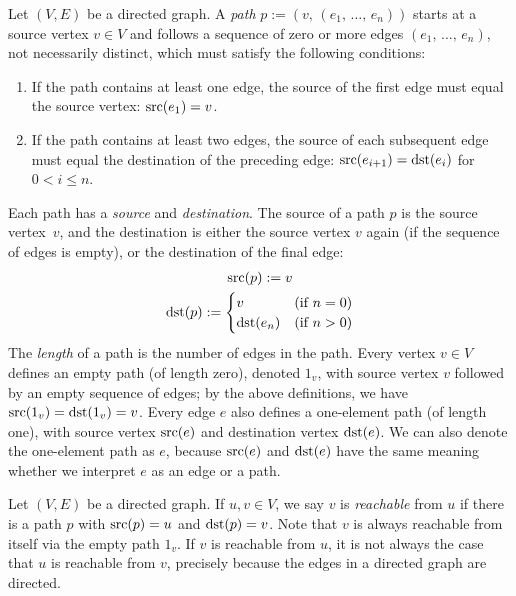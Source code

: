 \documentclass[../generics]{subfiles}
\begin{document}
\begin{definition}\label{digraph path}
Let $(V,E)$ be a directed graph. A \emph{path} $p := (v,\,(e_1,\,\ldots,\,e_n))$ starts at a source vertex $v\in V$ and follows a sequence of zero or more edges $(e_1,\,\ldots,\,e_n)$, not necessarily distinct, which must satisfy the following conditions:
\begin{enumerate}
\item If the path contains at least one edge, the source of the first edge must equal the source vertex: $\operatorname{src}(e_1)=v$.
\item If the path contains at least two edges, the source of each subsequent edge must equal the destination of the preceding edge: $\operatorname{src}(e_{i+1})=\operatorname{dst}(e_i)$ for $0<i\leq n$.
\end{enumerate}
Each path has a \emph{source} and \emph{destination}. The source of a path $p$ is the source vertex~$v$, and the destination is either the source vertex $v$ again (if the sequence of edges is empty), or the destination of the final edge:
\begin{gather*}
\operatorname{src}(p) := v\\
\operatorname{dst}(p) := \begin{cases}
v&\text{(if $n=0$)}\\
\operatorname{dst}(e_n)&\text{(if $n>0$)}
\end{cases}
\end{gather*}
The \emph{length} of a path is the number of edges in the path. Every vertex $v\in V$ defines an empty path (of length zero), denoted $1_v$, with source vertex $v$ followed by an empty sequence of edges; by the above definitions, we have $\operatorname{src}(1_v)=\operatorname{dst}(1_v)=v$. Every edge $e$ also defines a one-element path (of length one), with source vertex $\operatorname{src}(e)$ and destination vertex $\operatorname{dst}(e)$. We can also denote the one-element path as $e$, because $\operatorname{src}(e)$ and $\operatorname{dst}(e)$ have the same meaning whether we interpret $e$ as an edge or a path.
\end{definition}

\begin{definition}
Let $(V, E)$ be a directed graph. If $u,v\in V$, we say $v$ is \emph{reachable} from $u$ if there is a path $p$ with $\operatorname{src}(p)=u$ and $\operatorname{dst}(p)=v$. Note that $v$ is always reachable from itself via the empty path $1_v$. If $v$ is reachable from $u$, it is not always the case that $u$ is reachable from $v$, precisely because the edges in a directed graph are directed.
\end{definition}
\end{document}
